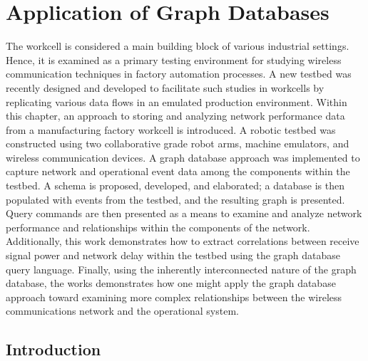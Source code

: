 
\chapter{Application of Graph Databases}\label{chapter:graphdb}

\chapterintro*

The workcell is considered a main building block of various industrial settings. Hence, it is examined as a primary testing environment for studying wireless communication techniques in factory automation processes. A new testbed was recently designed and developed to facilitate such studies in workcells by replicating various data flows in an emulated production environment. Within this chapter, an approach to storing and analyzing network performance data from a manufacturing factory workcell is introduced.  A robotic testbed was constructed using two collaborative grade robot arms, machine emulators, and wireless communication devices. A graph database approach was implemented to capture network and operational event data among the components within the testbed.  A schema is proposed, developed, and elaborated; a database is then populated with events from the testbed, and the resulting graph is presented. Query commands are then presented as a means to examine and analyze network performance and relationships within the components of the network.  Additionally, this work demonstrates how to extract correlations between receive signal power and network delay within the testbed using the graph database query language.  Finally, using the inherently interconnected nature of the graph database, the works demonstrates how one might apply the graph database approach toward examining more complex relationships between the wireless communications network and the operational system.

\section{Introduction} \label{gdbappl:sec::intro}

